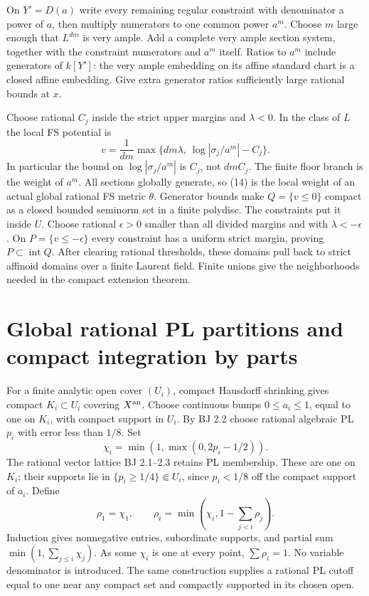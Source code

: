 \documentclass[
  11pt,
]{article}
\begin{document}
On \(Y'=D(a)\) write every remaining regular constraint with denominator
a power of \(a\), then multiply numerators to one common power \(a^m\).
Choose \(m\) large enough that \(L^{dm}\) is very ample. Add a complete
very ample section system, together with the constraint numerators and
\(a^m\) itself. Ratios to \(a^m\) include generators of \(k[Y']\): the
very ample embedding on its affine standard chart is a closed affine
embedding. Give extra generator ratios sufficiently large rational
bounds at \(x\).

Choose rational \(C_j\) inside the strict upper margins and
\(\lambda<0\). In the class of \(L\) the local FS potential is
\[v=\frac1{dm}\max\{dm\lambda,\ \log|\sigma_j/a^m|-C_j\}. \tag{14}\] In
particular the bound on \(\log|\sigma_j/a^m|\) is \(C_j\), not
\(dmC_j\). The finite floor branch is the weight of \(a^m\). All
sections globally generate, so (14) is the local weight of an actual
global rational FS metric \(\theta\). Generator bounds make
\(Q=\{v\le0\}\) compact as a closed bounded seminorm set in a finite
polydisc. The constraints put it inside \(U\). Choose rational
\(\epsilon>0\) smaller than all divided margins and with
\(\lambda<-\epsilon\). On \(P=\{v\le-\epsilon\}\) every constraint has a
uniform strict margin, proving \(P\subset\operatorname{int}Q\). After
clearing rational thresholds, these domains pull back to strict affinoid
domains over a finite Laurent field. Finite unions give the
neighborhoods needed in the compact extension theorem.

\section{Global rational PL partitions and compact integration by
parts}\label{global-rational-pl-partitions-and-compact-integration-by-parts}

For a finite analytic open cover \((U_i)\), compact Hausdorff shrinking
gives compact \(K_i\subset U_i\) covering \(X^{\rm an}\). Choose
continuous bumps \(0\le a_i\le1\), equal to one on \(K_i\), with compact
support in \(U_i\). By BJ 2.2 choose rational algebraic PL \(p_i\) with
error less than \(1/8\). Set \[\chi_i=\min(1,\max(0,2p_i-1/2)).\] The
rational vector lattice BJ 2.1--2.3 retains PL membership. These are one
on \(K_i\); their supports lie in \(\{p_i\ge1/4\}\Subset U_i\), since
\(p_i<1/8\) off the compact support of \(a_i\). Define
\[\rho_1=\chi_1,\qquad
 \rho_i=\min\left(\chi_i,1-\sum_{j<i}\rho_j\right). \tag{15}\] Induction
gives nonnegative entries, subordinate supports, and partial sum
\(\min(1,\sum_{j\le i}\chi_j)\). As some \(\chi_i\) is one at every
point, \(\sum\rho_i=1\). No variable denominator is introduced. The same
construction supplies a rational PL cutoff equal to one near any compact
set and compactly supported in its chosen open.
\end{document}
